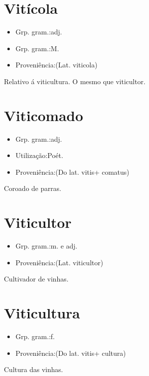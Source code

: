 \documentclass{article}
\begin{document}
\section{Vitícola}
\begin{itemize}
\item {Grp. gram.:adj.}
\end{itemize}
\begin{itemize}
\item {Grp. gram.:M.}
\end{itemize}
\begin{itemize}
\item {Proveniência:(Lat. \textunderscore viticola\textunderscore )}
\end{itemize}
Relativo á viticultura.
O mesmo que \textunderscore viticultor\textunderscore .
\section{Viticomado}
\begin{itemize}
\item {Grp. gram.:adj.}
\end{itemize}
\begin{itemize}
\item {Utilização:Poét.}
\end{itemize}
\begin{itemize}
\item {Proveniência:(Do lat. \textunderscore vitis\textunderscore  + \textunderscore comatus\textunderscore )}
\end{itemize}
Coroado de parras.
\section{Viticultor}
\begin{itemize}
\item {Grp. gram.:m.  e  adj.}
\end{itemize}
\begin{itemize}
\item {Proveniência:(Lat. \textunderscore viticultor\textunderscore )}
\end{itemize}
Cultivador de vinhas.
\section{Viticultura}
\begin{itemize}
\item {Grp. gram.:f.}
\end{itemize}
\begin{itemize}
\item {Proveniência:(Do lat. \textunderscore vitis\textunderscore  + \textunderscore cultura\textunderscore )}
\end{itemize}
Cultura das vinhas.
\end{document}
